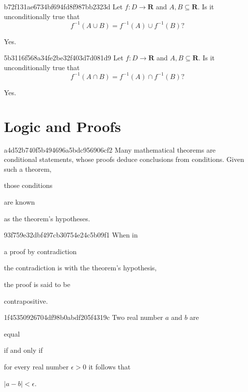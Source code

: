 \begin{note}{b72f131ae6734bf694fd8f987bb2323d}
    Let \({ f : D \to \mathbf{R} }\) and \({ A, B \subseteq \mathbf{R} }\).
    Is it unconditionally true that
    \[
        f^{-1}(A \cup B) = f^{-1}(A) \cup f^{-1}(B)?
    \]

    \begin{cloze}{1}
        Yes.
    \end{cloze}
\end{note}

\begin{note}{5b3116f568a34fe2be32f403d7d081d9}
    Let \({ f : D \to \mathbf{R} }\) and \({ A, B \subseteq \mathbf{R} }\).
    Is it unconditionally true that
    \[
        f^{-1}(A \cap B) = f^{-1}(A) \cap f^{-1}(B)?
    \]

    \begin{cloze}{1}
        Yes.
    \end{cloze}
\end{note}

\section{Logic and Proofs}
\begin{note}{a4d52b740f5b494696a5bdc956906cf2}
    Many mathematical theorems are conditional statements, whose proofs deduce conclusions from conditions. Given such a theorem, \begin{icloze}{1}those conditions\end{icloze} are known \begin{icloze}{2}as the theorem's hypotheses.\end{icloze}
\end{note}

\begin{note}{93f759e32dbf497cb30754e24c5b09f1}
    When in \begin{icloze}{3}a proof by contradiction\end{icloze} \begin{icloze}{2}the contradiction is with the theorem's hypothesis,\end{icloze} the proof is said to be \begin{icloze}{1}contrapositive.\end{icloze}
\end{note}

\begin{note}{1f45350926704df98b0abdf205f4319c}
    Two real number \({ a }\) and \({ b }\) are \begin{icloze}{4}equal\end{icloze} \begin{icloze}{3}if and only if\end{icloze} \begin{icloze}{2}for every real number \({ \epsilon > 0 }\) it follows that\end{icloze} \begin{icloze}{1}\({ \left\lvert a - b \right\rvert < \epsilon }\).\end{icloze}
\end{note}

